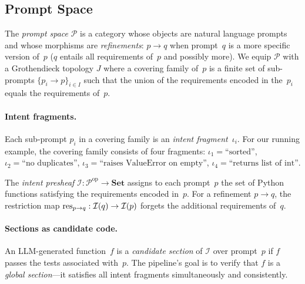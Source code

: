 \documentclass[11pt]{article}
\newcommand{\IntentSheaf}{\mathcal{I}}
\newcommand{\PromptSpace}{\mathcal{P}}
\newcommand{\IntentFrag}{\iota}
\begin{document}
\subsection{Prompt Space}\label{sec:prompt-space}

\begin{definition}\label{def:prompt-space}
The \emph{prompt space} $\PromptSpace$ is a category whose objects are
natural language prompts and whose morphisms are \emph{refinements}:
$p \to q$ when prompt~$q$ is a more specific version of~$p$ (\ie $q$
entails all requirements of~$p$ and possibly more).  We equip
$\PromptSpace$ with a Grothendieck topology $J$ where a covering
family of~$p$ is a finite set of sub-prompts
$\{p_i \to p\}_{i \in I}$ such that the union of the requirements
encoded in the~$p_i$ equals the requirements of~$p$.
\end{definition}

\paragraph{Intent fragments.}
Each sub-prompt $p_i$ in a covering family is an \emph{intent
fragment}~$\IntentFrag_i$.  For our running example, the covering
family consists of four fragments:
$\IntentFrag_1 = \text{``sorted''}$,
$\IntentFrag_2 = \text{``no duplicates''}$,
$\IntentFrag_3 = \text{``raises ValueError on empty''}$,
$\IntentFrag_4 = \text{``returns list of int''}$.

\begin{definition}\label{def:intent-presheaf}
The \emph{intent presheaf} $\IntentSheaf : \PromptSpace^{\mathrm{op}}
\to \mathbf{Set}$ assigns to each prompt~$p$ the set of Python
functions satisfying the requirements encoded in~$p$.  For a
refinement $p \to q$, the restriction map
$\res_{p \to q} : \IntentSheaf(q) \to \IntentSheaf(p)$ forgets the
additional requirements of~$q$.
\end{definition}

\paragraph{Sections as candidate code.}
An LLM-generated function~$f$ is a \emph{candidate section} of
$\IntentSheaf$ over prompt~$p$ if $f$ passes the tests associated
with~$p$.  The pipeline's goal is to verify that $f$ is a
\emph{global section}---it satisfies all intent fragments
simultaneously and consistently.

\end{document}
